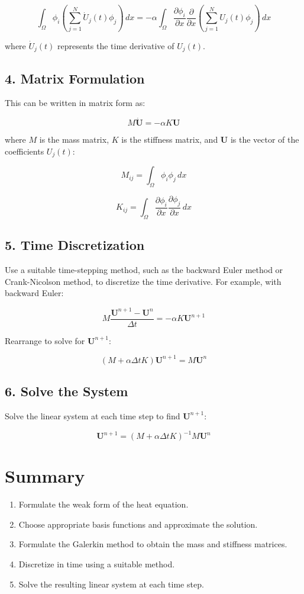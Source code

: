 \documentclass{article}
\begin{document}
\[
\int_{\Omega} \phi_i \left( \sum_{j=1}^{N} \dot{U}_j(t) \phi_j \right) \, dx = -\alpha \int_{\Omega} \frac{\partial \phi_i}{\partial x} \frac{\partial}{\partial x} \left( \sum_{j=1}^{N} U_j(t) \phi_j \right) \, dx
\]

where \(\dot{U}_j(t)\) represents the time derivative of \(U_j(t)\).

\subsection*{4. Matrix Formulation}
This can be written in matrix form as:

\[
M \mathbf{\dot{U}} = -\alpha K \mathbf{U}
\]

where \(M\) is the mass matrix, \(K\) is the stiffness matrix, and \(\mathbf{U}\) is the vector of the coefficients \(U_j(t)\):

\[
M_{ij} = \int_{\Omega} \phi_i \phi_j \, dx
\]

\[
K_{ij} = \int_{\Omega} \frac{\partial \phi_i}{\partial x} \frac{\partial \phi_j}{\partial x} \, dx
\]

\subsection*{5. Time Discretization}
Use a suitable time-stepping method, such as the backward Euler method or Crank-Nicolson method, to discretize the time derivative. For example, with backward Euler:

\[
M \frac{\mathbf{U}^{n+1} - \mathbf{U}^n}{\Delta t} = -\alpha K \mathbf{U}^{n+1}
\]

Rearrange to solve for \(\mathbf{U}^{n+1}\):

\[
\left( M + \alpha \Delta t K \right) \mathbf{U}^{n+1} = M \mathbf{U}^n
\]

\subsection*{6. Solve the System}
Solve the linear system at each time step to find \(\mathbf{U}^{n+1}\):

\[
\mathbf{U}^{n+1} = \left( M + \alpha \Delta t K \right)^{-1} M \mathbf{U}^n
\]

\section*{Summary}
\begin{enumerate}
    \item Formulate the weak form of the heat equation.
    \item Choose appropriate basis functions and approximate the solution.
    \item Formulate the Galerkin method to obtain the mass and stiffness matrices.
    \item Discretize in time using a suitable method.
    \item Solve the resulting linear system at each time step.
\end{enumerate}
\end{document}
